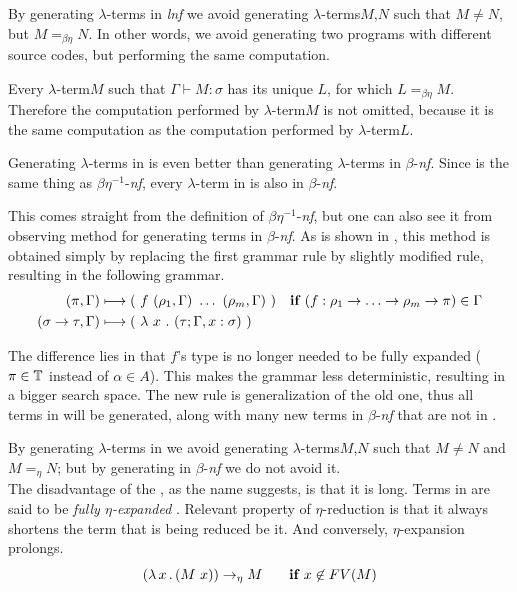 \documentclass[12pt,a4paper]{report}
\newcommand{\lterm}{$\lambda$-term\xspace}
\newcommand{\lterms}{$\lambda$-terms\xspace}
\newcommand{\turst}[3]{$#1\vdash{}#2:#3$\xspace}
\newcommand{\GMS}{\turst{\Gamma}{M}{\sigma}}
\begin{document}
By generating \lterms in \textit{lnf} we avoid generating 
\lterms $M$,$N$ such that $M \not= N$, but $M =_{\beta\eta} N$.
In other words, we avoid generating two programs with different 
source codes, but performing the same computation.

Every \lterm $M$ such that \GMS has its unique \lnf $L$, 
for which $L =_{\beta\eta} M$.
Therefore the computation performed by \lterm $M$ 
is not omitted, because it is the same computation
as the computation performed by \lterm $L$. \\


\newcommand{\etar}{\twoheadrightarrow_\eta}
\newcommand{\ered}{$\eta$-reduction\xspace}
\newcommand{\bnf}{$\beta$-\textit{nf}\xspace}
\newcommand{\enf}{$\eta$-\textit{nf}\xspace}
\newcommand{\eenf}{$\eta^{-1}$-\textit{nf}\xspace}
\newcommand{\beenf}{$\beta\eta^{-1}$-\textit{nf}\xspace}
\newcommand{\benf}{$\beta\eta$-\textit{nf}\xspace}
\newcommand{\bredex}{$\beta$-redex\xspace} 


Generating \lterms in \lnf is even better than generating 
\lterms in \bnf. Since \lnf is the same thing as \beenf,
every \lterm in \lnf is also in \bnf. 

This comes straight from the definition of \beenf, 
but one can also see it from observing method for generating
terms in \bnf. As is shown in \cite{barendregt10}, 
this method is obtained simply by replacing  
the first grammar rule by slightly modified rule,
resulting in the following grammar.
\begin{align*}
( \pi , \Gamma )  
&\gar
(~f~( \rho_1 , \Gamma )~\dots~( \rho_m , \Gamma )~)
& \textbf{if } (f : \rho_1 \ar \dots \ar \rho_m \ar \pi) \in \Gamma
\\ 
( \sigma \rightarrow \tau , \Gamma )  
&\gar
(~\lambda~x~.~( \tau ; \Gamma,x:\sigma )~)
&   
\end{align*}

The difference lies in that $f$'s type is no longer needed to be fully expanded
($\pi \in \mathbb{T}$ instead of $\alpha \in A$). This makes the grammar less deterministic,
resulting in a bigger search space. The new rule is generalization of the old one,
thus all terms in \lnf will be generated, along with many new terms in \bnf that 
are not in \lnf. 
    
By generating \lterms in \lnf we avoid generating 
\lterms $M$,$N$ such that $M \not= N$ and $M =_{\eta} N$; 
but by generating in \bnf we do not avoid it.\\


The disadvantage of the \lnf, as the name suggests, is that it is long.
Terms in \lnf are said to be \textit{fully $\eta$-expanded} \cite{barendregt10}. 
Relevant property of $\eta$-reduction is that it always shortens the term
that is being reduced be it. And conversely, $\eta$-expansion prolongs.
$$( \lambda \, x \, . \, (M~x) ) \rightarrow_\eta M \textbf{ ~~~~if } x \not\in FV(M) $$
\end{document}
